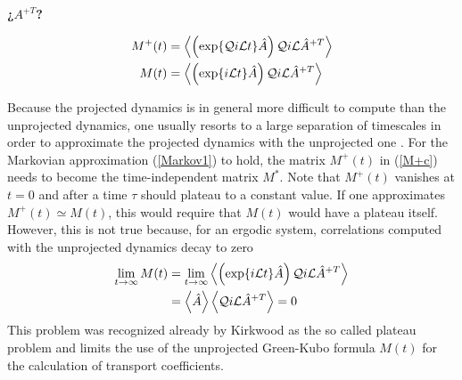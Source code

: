 \documentclass[b5paper,openright,10pt]{book}
\newcommand{\Note}[1]{{\bf \color{red}#1}}    %
\newcommand{\llangle}{\left\langle}
\newcommand{\rrangle}{\right\rangle}
\begin{document}
\Note{¿$A^{+T}$?}

\begin{align}
M^+(t)&=
  \llangle\left(\exp\{{\cal Q}i{\cal L}t\}  \hat{A}\right){\cal Q}i{\cal L}\hat{A}^{+T} \rrangle
\nonumber\\
M(t)&=
  \llangle\left(\exp\{i{\cal L}t\}  \hat{A}\right){\cal Q}i{\cal L}\hat{A}^{+T} \rrangle
\label{m+}
\end{align}

Because the projected dynamics is in general more difficult to compute
than  the  unprojected  dynamics,  one  usually  resorts  to  a  large
separation  of  timescales  in  order  to approximate  the  projected
dynamics with  the unprojected  one \cite{Zwanzig1961,Selwyn1971,Mazur1970}.
For the  Markovian approximation  (\ref{Markov1}) to hold,  the matrix
$M^+(t)$ in  (\ref{M+c}) needs  to become the  time-independent matrix
$M^*$.  Note that  $M^+(t)$ vanishes at $t=0$ and after  a time $\tau$
should plateau to a constant value.  If one approximates $M^+(t)\simeq
M(t)$,  this   would  require  that   $M(t)$  would  have   a  plateau
itself.  However, this  is not  true because,  for an  ergodic system,
correlations computed with the unprojected dynamics decay to zero
\begin{align}
  \lim_{t\to\infty}M(t)&= \lim_{t\to\infty} \llangle\left(\exp\{i{\cal L}t\}  \hat{A}\right){\cal Q}i{\cal L}\hat{A}^{+T} \rrangle
\nonumber\\
&=
 \llangle  \hat{A}\rrangle\llangle{\cal Q}i{\cal L}\hat{A}^{+T} \rrangle=0
\end{align}
This  problem was  recognized already  by  Kirkwood as  the so  called
plateau problem \cite{Kirkwood1949,Espanol1993}  and limits the
use of the  unprojected Green-Kubo formula $M(t)$  for the calculation
of transport coefficients.
\end{document}
